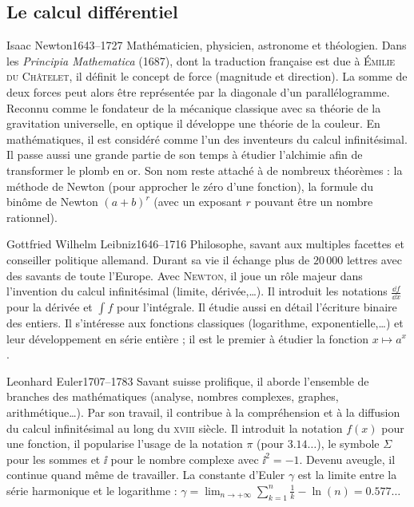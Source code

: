 \documentclass[10pt,class=article,crop=false]{standalone}
\begin{document}
\begin{multicols}{2}
\subsection{Le calcul différentiel}

\begin{biographie}{Isaac Newton}{1643--1727}
Mathématicien, physicien, astronome et théologien.
Dans les \emph{Principia Mathematica} (1687), dont la traduction française est due à \textsc{Émilie du Châtelet}, il définit le concept de force (magnitude et direction). La somme de deux forces peut alors être représentée par la diagonale d’un parallélogramme. Reconnu comme le fondateur de la mécanique classique avec sa théorie de la gravitation universelle, en optique il développe une théorie de la couleur.
En mathématiques, il est considéré comme l’un des inventeurs du calcul infinitésimal. Il passe aussi une grande partie de son temps à étudier l'alchimie afin de transformer le plomb en or.
Son nom reste attaché à de nombreux théorèmes : la méthode de Newton (pour approcher le zéro d'une fonction), la formule du binôme de Newton $(a+b)^r$ (avec un exposant $r$ pouvant être un nombre rationnel).
\end{biographie}


\begin{biographie}{Gottfried Wilhelm Leibniz}{1646--1716}
Philosophe, savant aux multiples facettes et conseiller politique allemand. 
Durant sa vie il échange plus de $20\,000$ lettres avec des savants de toute l'Europe.
Avec \textsc{Newton}, il joue un rôle majeur dans l’invention du calcul infinitésimal (limite, dérivée,\ldots). Il introduit les notations $\frac{\dd f}{\dd x}$ pour la dérivée et $\int f$ pour l'intégrale. Il étudie aussi en détail l'écriture binaire des entiers.
Il s'intéresse aux fonctions classiques (logarithme, exponentielle,\ldots) et leur développement en série entière ; il est le premier à étudier la fonction $x \mapsto a^x$.
\end{biographie}


\begin{biographie}{Leonhard Euler}{1707--1783}
Savant suisse prolifique, il aborde l’ensemble de branches des mathématiques (analyse, nombres complexes, graphes, arithmétique\ldots). Par son travail, il contribue à la compréhension et à la diffusion du calcul infinitésimal au long du \textsc{xviii}\ieme{} siècle. Il introduit la notation $f(x)$ pour une fonction, il popularise l'usage de la notation $\pi$ (pour $3.14\ldots$),
le symbole $\Sigma$ pour les sommes et $\ii$ pour le nombre complexe avec $\ii^2=-1$. Devenu aveugle, il continue quand même de travailler.
La constante d'Euler $\gamma$ est la limite entre la série harmonique et le logarithme : $\gamma = \lim_{n\to+\infty} \sum_{k=1}^{n}{\frac1k} - \ln(n) = 0.577\ldots$
\end{biographie}



\end{multicols}
\end{document}
